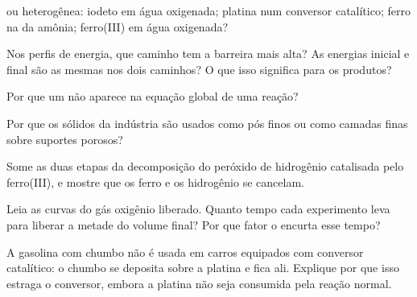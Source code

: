 \begin{exercise}[$\star$]\label{exo:g12:catalysis:2}
 ou heterogênea:  iodeto em água oxigenada;
platina num conversor catalítico; ferro na  da amônia; 
ferro(III) em água oxigenada?
\end{exercise}

\begin{exercise}[$\star$]\label{exo:g12:catalysis:3}
Nos perfis de energia, que caminho tem a barreira mais alta? As energias
inicial e final são as mesmas nos dois caminhos? O que isso significa
para os produtos?
\end{exercise}

\begin{exercise}[$\star$]\label{exo:g12:catalysis:4}
Por que um  não aparece na equação global de uma reação?
\end{exercise}

\begin{exercise}[$\star$]\label{exo:g12:catalysis:5}
Por que os  sólidos da indústria são usados como pós finos
ou como camadas finas sobre suportes porosos?
\end{exercise}

\begin{exercise}[$\star\star$]\label{exo:g12:catalysis:6}
Some as duas etapas da decomposição do peróxido de hidrogênio catalisada
pelo ferro(III), e mostre que os  ferro e os  hidrogênio se
cancelam.
\end{exercise}

\begin{exercise}[$\star\star$]\label{exo:g12:catalysis:7}
Leia as curvas do gás oxigênio liberado. Quanto tempo cada experimento
leva para liberar a metade do volume final? Por que fator o 
encurta esse tempo?
\end{exercise}

\begin{exercise}[$\star\star$]\label{exo:g12:catalysis:8}
A gasolina com chumbo não é usada em carros equipados com conversor
catalítico: o chumbo se deposita sobre a platina e fica ali. Explique
por que isso estraga o conversor, embora a platina não seja consumida
pela reação normal.
\end{exercise}

